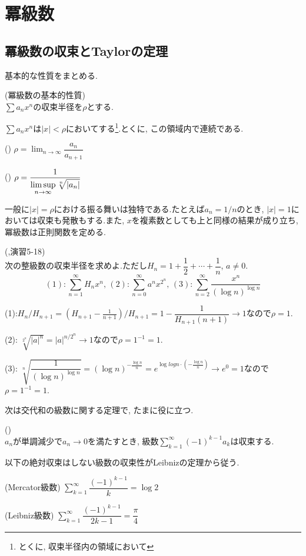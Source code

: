 \section{冪級数}
\subsection{冪級数の収束とTaylorの定理}
基本的な性質をまとめる.
\begin{prop} (冪級数の基本的性質)\\
$\sum a_nx^{n}$の収束半径を$\rho$とする.
\ben
\item $\sum a_nx^{n}$は$|x|<\rho$においてする\footnote{とくに, 収束半径内の領域において}.とくに, この領域内で連続である.
\item () $\rho=\displaystyle\lim_{n\to \infty} \dfrac{a_n}{a_{n+1}}$
\item () $\rho=\dfrac{1}{\displaystyle\limsup_{n\to \infty} \sqrt[n]{|a_n|}}$
\item
\een
\end{prop}
\begin{rem}
一般に$|x| = \rho$における振る舞いは独特である.たとえば$a_n =1/n$のとき, $|x| = 1$においては収束も発散もする.また, $x$を複素数としても上と同様の結果が成り立ち, 冪級数は正則関数を定める.
\end{rem}

\begin{egprob} (\cite{rikou},演習5-18)\\
次の整級数の収束半径を求めよ.ただし$H_n=1+\dfrac{1}{2}+\cdots+ \dfrac{1}{n}$, $a\neq 0$.
\[(1): \sum_{n=1}^{\infty} H_nx^{n},  \, (2): \sum_{n=0}^{\infty} a^{n}x^{2^{n}},\, (3): \sum_{n=2}^{\infty} \dfrac{x^{n}}{(\log{n})^{\log{n}}}\]
\end{egprob}
\begin{egans}
(1):$H_n/H_{n+1} = (H_{n+1} - \frac{1}{n+1})/H_{n+1}= 1 - \dfrac{1}{H_{n+1}(n+1)}\to 1$なので$\rho=1$.

(2): $\sqrt[2^{n}]{|a|^{n}} = |a|^{n/2^{n}} \to 1$なので$\rho=1^{-1}=1$.

(3): $\sqrt[n]{\dfrac{1}{(\log{n})^{\log{n}}}} = (\log{n})^{-\frac{\log{n}}{n}} = e^{\log{log{n}}\cdot (-\frac{\log{n}}{n})}\to e^{0} = 1$なので$\rho=1^{-1}=1$.
\end{egans}

次は交代和の級数に関する定理で, たまに役に立つ.
\besha
\begin{theo} ()　\label{theo:leibniz_theorem}\\
$a_n$が単調減少で$a_n\to 0$を満たすとき, 級数$\sum_{k=1}^{\infty} (-1)^{k-1}a_k$は収束する.
\end{theo}
\ensha
\begin{eg}
以下の絶対収束はしない級数の収束性がLeibnizの定理から従う.
\ben
\item (Mercator級数) $\sum_{k=1}^{\infty}\dfrac{(-1)^{k-1}}{k} = \log{2}$
\item (Leibniz級数) $\sum_{k=1}^{\infty} \dfrac{(-1)^{k-1}}{2k-1} = \dfrac{\pi}{4}$
\een
\end{eg}


